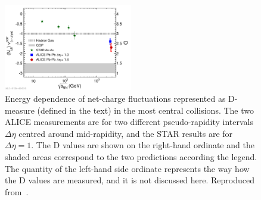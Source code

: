 \begin{figure}
\centering
\includegraphics[width=0.5\textwidth]{ksfigures/NetChargeFluct.pdf}
\caption{Energy dependence of net-charge fluctuations represented as D-measure (defined in the text) in the most central collisions. The two ALICE measurements are for two different pseudo-rapidity intervals $\Delta\eta$ centred around mid-rapidity, and the STAR results are for $\Delta\eta = 1$. The D values are shown on the right-hand ordinate and the shaded areas correspond to the two predictions according the legend. The quantity of the left-hand side ordinate represents the way how the D values are measured, and it is not discussed here. Reproduced from~\cite{Abelev:2012pv}.}
\label{figks:ChargeFluct}
\end{figure}

